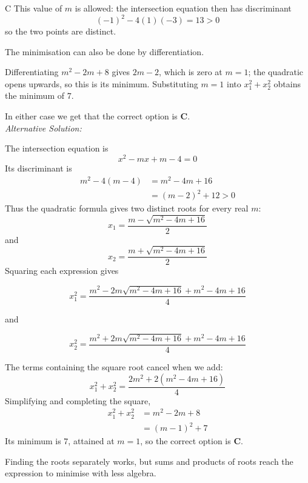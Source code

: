 \documentclass[11pt,a4paper]{article}
\begin{document}
\begin{enumerate}[label=\textbf{\arabic*.},leftmargin=*,itemsep=0pt,start=2]
\begin{djsSolution}{C}
This value of $m$ is allowed: the intersection equation then has discriminant
\[
(-1)^2-4(1)(-3)=13>0
\]
so the two points are distinct.

The minimisation can also be done by differentiation. 

Differentiating $m^2-2m+8$ gives $2m-2$, which is zero at $m=1$; the quadratic opens upwards, so this is its minimum. Substituting $m=1$ into $x_1^2+x_2^2$ obtains the minimum of $7$.

In either case we get that the correct option is \textbf{C}.\\[5pt]

\textit{Alternative Solution:}

The intersection equation is
\[
x^2-mx+m-4=0
\]
Its discriminant is
\[
\begin{aligned}
m^2-4(m-4)&=m^2-4m+16\\
&=(m-2)^2+12>0
\end{aligned}
\]
Thus the quadratic formula gives two distinct roots for every real $m$:
\[
x_1=\frac{m-\sqrt{m^2-4m+16}}{2}
\]
and
\[
x_2=\frac{m+\sqrt{m^2-4m+16}}{2}
\]
Squaring each expression gives

\[
x_1^2=\frac{m^2-2m\sqrt{m^2-4m+16}+m^2-4m+16}{4}
\]

and

\[
x_2^2=\frac{m^2+2m\sqrt{m^2-4m+16}+m^2-4m+16}{4}
\]

The terms containing the square root cancel when we add:
\[
x_1^2+x_2^2=\frac{2m^2+2(m^2-4m+16)}{4}
\]
Simplifying and completing the square,
\[
\begin{aligned}
x_1^2+x_2^2&=m^2-2m+8\\
&=(m-1)^2+7
\end{aligned}
\]
Its minimum is $7$, attained at $m=1$, so the correct option is \textbf{C}.

Finding the roots separately works, but sums and products of roots reach the expression to minimise with less algebra.
\end{djsSolution}
\end{enumerate}
\clearpage
\thispagestyle{djssolutions}
\vspace*{8pt}
\end{document}
